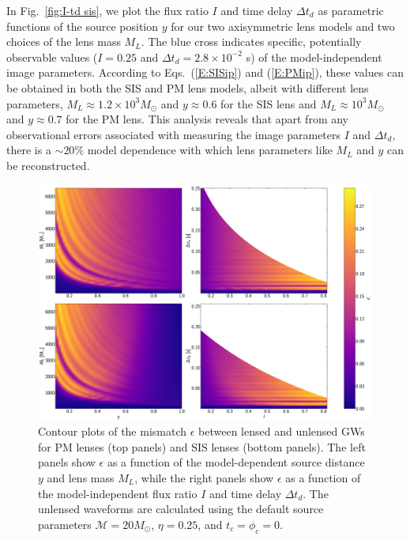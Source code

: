 \documentclass[floats,floatfix,showpacs,amssymb,prd,twocolumn,superscriptaddress,nofootinbib,nolongbibliography,reprint]{revtex4-2}
\begin{document}
In Fig.~\ref{fig:I-td sis}, we plot the flux ratio $I$ and time delay $\Delta t_d$ as parametric functions of the source position $y$ for our two axisymmetric lens models and two choices of the lens mass $M_L$. The blue cross indicates specific, potentially observable values ($I = 0.25$ and $\Delta t_d = 2.8 \times 10^{-2}$ s) of the model-independent image parameters. According to Eqs.~(\ref{E:SISip}) and (\ref{E:PMip}), these values can be obtained in both the SIS and PM lens models, albeit with different lens parameters, $M_L \approx 1.2 \times 10^3 M_\odot$ and $y \approx 0.6$ for the SIS lens and $M_L \approx 10^3 M_\odot$ and $y \approx 0.7$ for the PM lens.  This analysis reveals that apart from any observational errors associated with measuring the image parameters $I$ and $\Delta t_d$, there is a $\sim20\%$ model dependence with which lens parameters like $M_L$ and $y$ can be reconstructed.
\begin{figure}[t!]
    \centering
    \includegraphics[scale = 0.29]{Figures/contour_plot_subplot_lensparam_combo.pdf}
    \caption{
    Contour plots of the mismatch $\epsilon$ between lensed and unlensed GWs for PM lenses (top panels) and SIS lenses (bottom panels). The left panels show $\epsilon$ as a function of the model-dependent source distance $y$ and lens mass $M_L$, while the right panels show $\epsilon$ as a function of the model-independent flux ratio $I$ and time delay $\Delta t_d$. The unlensed waveforms are calculated using the default source parameters $\mathcal{M} = 20 M_\odot$, $\eta = 0.25$, and $t_c = \phi_c = 0$.
    } 
    \label{fig:contour mismatch y-ML}
\end{figure}
\end{document}
